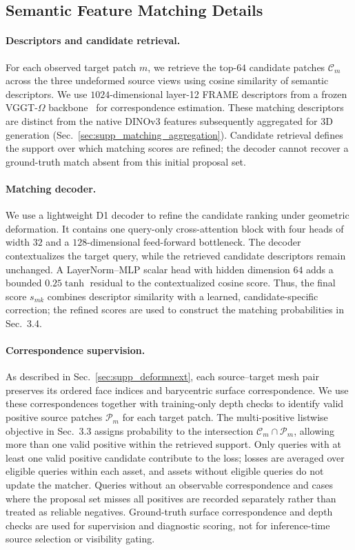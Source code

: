 \begin{appendix}
\section{Semantic Feature Matching Details}
\label{sec:supp_semantic_matching}

\paragraph{Descriptors and candidate retrieval.}
For each observed target patch $m$, we retrieve the top-$64$ candidate patches $\mathcal{C}_m$ across the three undeformed source views using cosine similarity of semantic descriptors.
We use $1024$-dimensional layer-12 FRAME descriptors from a frozen VGGT-$\Omega$ backbone~\cite{wang2026vggtomega} for correspondence estimation.
These matching descriptors are distinct from the native DINOv3 features subsequently aggregated for 3D generation (Sec.~\ref{sec:supp_matching_aggregation}).
Candidate retrieval defines the support over which matching scores are refined; the decoder cannot recover a ground-truth match absent from this initial proposal set.

\paragraph{Matching decoder.}
We use a lightweight D1 decoder to refine the candidate ranking under geometric deformation.
It contains one query-only cross-attention block with four heads of width $32$ and a $128$-dimensional feed-forward bottleneck.
The decoder contextualizes the target query, while the retrieved candidate descriptors remain unchanged.
A LayerNorm--MLP scalar head with hidden dimension $64$ adds a bounded $0.25\tanh$ residual to the contextualized cosine score.
Thus, the final score $s_{mk}$ combines descriptor similarity with a learned, candidate-specific correction; the refined scores are used to construct the matching probabilities in Sec.~3.4.

\paragraph{Correspondence supervision.}
As described in Sec.~\ref{sec:supp_deformnext}, each source--target mesh pair preserves its ordered face indices and barycentric surface correspondence.
We use these correspondences together with training-only depth checks to identify valid positive source patches $\mathcal{P}_m$ for each target patch.
The multi-positive listwise objective in Sec.~3.3 assigns probability to the intersection $\mathcal{C}_m\cap\mathcal{P}_m$, allowing more than one valid positive within the retrieved support.
Only queries with at least one valid positive candidate contribute to the loss; losses are averaged over eligible queries within each asset, and assets without eligible queries do not update the matcher.
Queries without an observable correspondence and cases where the proposal set misses all positives are recorded separately rather than treated as reliable negatives.
Ground-truth surface correspondence and depth checks are used for supervision and diagnostic scoring, not for inference-time source selection or visibility gating.


\end{appendix}

